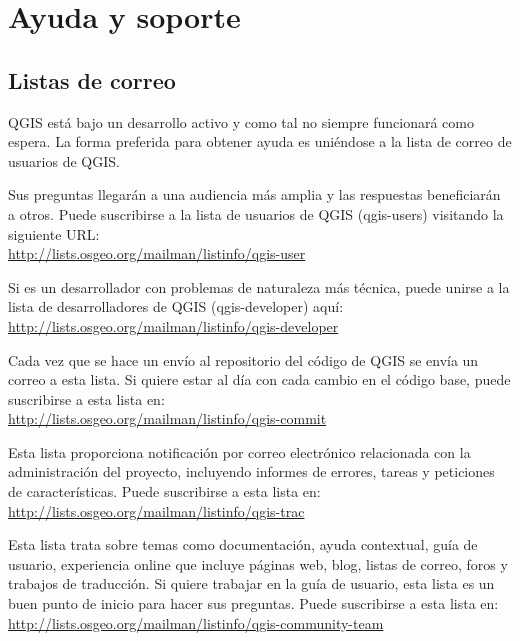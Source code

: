 
\section{Ayuda y soporte}\label{label_helpsupport}


\subsection{Listas de correo}
QGIS está bajo un desarrollo activo y como tal no siempre funcionará como espera. La forma preferida para obtener ayuda
es uniéndose a la lista de correo de usuarios de QGIS.

Sus preguntas llegarán a una audiencia más amplia y las respuestas beneficiarán a otros. Puede 
suscribirse a la lista de usuarios de QGIS (qgis-users) visitando la siguiente URL: \\
\url{http://lists.osgeo.org/mailman/listinfo/qgis-user}

Si es un desarrollador con problemas de naturaleza más técnica, puede unirse a la lista de desarrolladores de QGIS (qgis-developer) aquí:\\
\url{http://lists.osgeo.org/mailman/listinfo/qgis-developer}

Cada vez que se hace un envío al repositorio del código de QGIS se envía un correo a esta lista. Si quiere 
estar al día con cada cambio en el código base, puede suscribirse a esta lista en:\\
\url{http://lists.osgeo.org/mailman/listinfo/qgis-commit}

Esta lista proporciona notificación por correo electrónico relacionada con la administración del 
proyecto, incluyendo informes de errores, tareas y peticiones de características. Puede suscribirse a esta lista en:\\
\url{http://lists.osgeo.org/mailman/listinfo/qgis-trac}

Esta lista trata sobre temas como documentación, ayuda contextual, guía de usuario, experiencia online que 
incluye páginas web, blog, listas de correo, foros y trabajos de traducción. Si quiere trabajar en la guía de 
usuario, esta lista es un buen punto de inicio para hacer sus preguntas. Puede suscribirse a esta lista en:\\
\url{http://lists.osgeo.org/mailman/listinfo/qgis-community-team}

